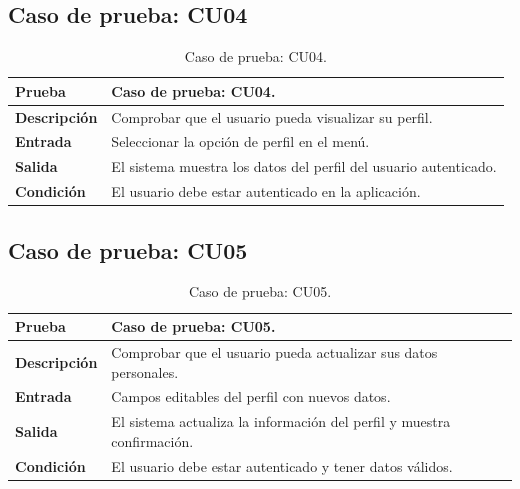 
\subsection{Caso de prueba: CU04}

\begin{table}[ht]
\centering
\renewcommand{\arraystretch}{1.3}
\begin{tabular}{|p{3cm}|p{12cm}|}
\hline
\rowcolor[RGB]{191,191,191}
\textbf{Prueba} & Caso de prueba: CU04. \\
\hline
\textbf{Descripción} \cellcolor[RGB]{217,217,217} & Comprobar que el usuario pueda visualizar su perfil. \\
\hline
\textbf{Entrada} \cellcolor[RGB]{217,217,217} & Seleccionar la opción de perfil en el menú. \\
\hline
\textbf{Salida} \cellcolor[RGB]{217,217,217} & El sistema muestra los datos del perfil del usuario autenticado. \\
\hline
\textbf{Condición} \cellcolor[RGB]{217,217,217} & El usuario debe estar autenticado en la aplicación. \\
\hline
\end{tabular}
\caption{Caso de prueba: CU04.}
\label{tab:cu04_black_test}
\end{table}


\subsection{Caso de prueba: CU05}

\begin{table}[ht]
\centering
\renewcommand{\arraystretch}{1.3}
\begin{tabular}{|p{3cm}|p{12cm}|}
\hline
\rowcolor[RGB]{191,191,191}
\textbf{Prueba} & Caso de prueba: CU05. \\
\hline
\textbf{Descripción} \cellcolor[RGB]{217,217,217} & Comprobar que el usuario pueda actualizar sus datos personales. \\
\hline
\textbf{Entrada} \cellcolor[RGB]{217,217,217} & Campos editables del perfil con nuevos datos. \\
\hline
\textbf{Salida} \cellcolor[RGB]{217,217,217} & El sistema actualiza la información del perfil y muestra confirmación. \\
\hline
\textbf{Condición} \cellcolor[RGB]{217,217,217} & El usuario debe estar autenticado y tener datos válidos. \\
\hline
\end{tabular}
\caption{Caso de prueba: CU05.}
\label{tab:cu05_black_test}
\end{table}

